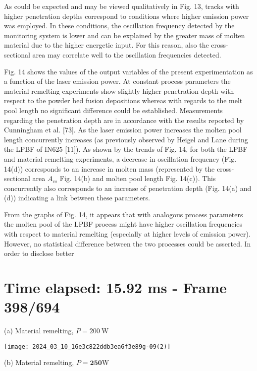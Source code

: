 \documentclass[10pt]{article}
\begin{document}
As could be expected and may be viewed qualitatively in Fig. 13, tracks with higher penetration depths correspond to conditions where higher emission power was employed. In these conditions, the oscillation frequency detected by the monitoring system is lower and can be explained by the greater mass of molten material due to the higher energetic input. For this reason, also the cross-sectional area may correlate well to the oscillation frequencies detected.

Fig. 14 shows the values of the output variables of the present experimentation as a function of the laser emission power. At constant process parameters the material remelting experiments show slightly higher penetration depth with respect to the powder bed fusion depositions whereas with regards to the melt pool length no significant difference could be established. Measurements regarding the penetration depth are in accordance with the results reported by Cunningham et al. [73]. As the laser emission power increases the molten pool length concurrently increases (as previously observed by Heigel and Lane during the LPBF of IN625 [11]). As shown by the trends of Fig. 14, for both the LPBF and material remelting experiments, a decrease in oscillation frequency (Fig. 14(d)) corresponds to an increase in molten mass (represented by the cross-sectional area $A_{c s}$ Fig. 14(b) and molten pool length Fig. 14(c)). This concurrently also corresponds to an increase of penetration depth (Fig. 14(a) and (d)) indicating a link between these parameters.

From the graphs of Fig. 14, it appears that with analogous process parameters the molten pool of the LPBF process might have higher oscillation frequencies with respect to material remelting (especially at higher levels of emission power). However, no statistical difference between the two processes could be asserted. In order to disclose better

\section*{Time elapsed: 15.92 ms - Frame 398/694}
(a) Material remelting, $P=200 \mathrm{~W}$

\begin{center}
\texttt{[image: 2024\_03\_10\_16e3c822ddb3ea6f3e89g-09(2)]}
\end{center}

(b) Material remelting, $P=\mathbf{2 5 0} \mathrm{W}$
\end{document}
